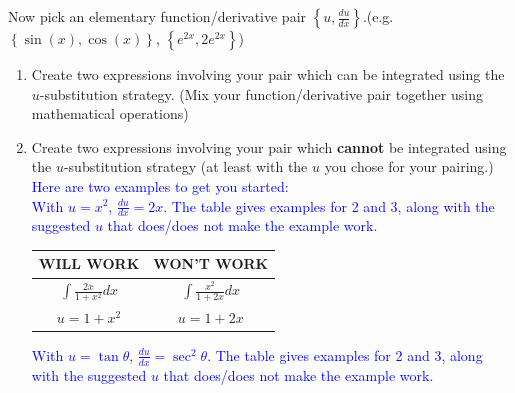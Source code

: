 \documentclass{ximera}
\begin{document}
\begin{exercise}
    Now pick an elementary function/derivative pair $\left\{ u, \frac{du}{dx}\right\}$.(e.g. $\left\{\sin(x),\cos(x)\right\}$, $\left\{e^{2x},2e^{2x}\right\}$) \\
    \begin{enumerate}
    
    \item Create two expressions involving your pair which can be integrated using the $u$-substitution strategy. (Mix your function/derivative pair together using mathematical operations)


    \item Create two expressions involving your pair which {\bf{cannot}} be integrated using the $u$-substitution strategy (at least with the $u$ you chose for your pairing.)\\
    \textcolor{blue}{Here are two examples to get you started:}\\
        \textcolor{blue}{
        With $u = x^2$, $\frac{du}{dx} = 2x$.  The table gives examples for 2 and 3, along with the suggested $u$ that does/does not make the example work.}
        
        \begin{center}\begin{tabular}{cc}
        WILL WORK & WON'T WORK\\\hline
        $\int\frac{2x}{1+x^2}dx$ & $\int\frac{x^2}{1+2x}dx$ \\
        $u=1+x^2$ & $u=1+2x$ \end{tabular}\end{center}
    
    \textcolor{blue}{
        With $u = \tan\theta $, $\frac{du}{dx} = \sec^2\theta$. The table gives examples for 2 and 3, along with the suggested $u$ that does/does not make the example work.}
       

\end{enumerate}
\end{exercise}
\end{document}
